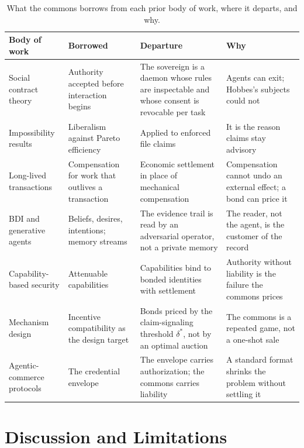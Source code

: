 \documentclass[11pt,a4paper]{article}
\theoremstyle{definition}
\theoremstyle{remark}
\begin{document}
\begin{table}[H]
\centering\small
\caption{What the commons borrows from each prior body of work, where it departs, and why.}
\label{tab:related-borrow-depart}
\begin{tabularx}{\textwidth}{@{}>{\raggedright\arraybackslash}p{} >{\raggedright\arraybackslash}X >{\raggedright\arraybackslash}X >{\raggedright\arraybackslash}X@{}}
\toprule
\textbf{Body of work} & \textbf{Borrowed} & \textbf{Departure} & \textbf{Why} \\
\midrule
Social contract theory & Authority accepted before interaction begins & The sovereign is a daemon whose rules are inspectable and whose consent is revocable per task & Agents can exit; Hobbes's subjects could not \\
Impossibility results & Liberalism against Pareto efficiency & Applied to enforced file claims & It is the reason claims stay advisory \\
Long-lived transactions & Compensation for work that outlives a transaction & Economic settlement in place of mechanical compensation & Compensation cannot undo an external effect; a bond can price it \\
BDI and generative agents & Beliefs, desires, intentions; memory streams & The evidence trail is read by an adversarial operator, not a private memory & The reader, not the agent, is the customer of the record \\
Capability-based security & Attenuable capabilities & Capabilities bind to bonded identities with settlement & Authority without liability is the failure the commons prices \\
Mechanism design & Incentive compatibility as the design target & Bonds priced by the claim-signaling threshold $\delta^{*}$, not by an optimal auction & The commons is a repeated game, not a one-shot sale \\
Agentic-commerce protocols & The credential envelope & The envelope carries authorization; the commons carries liability & A standard format shrinks the problem without settling it \\
\bottomrule
\end{tabularx}
\end{table}

\section{Discussion and Limitations}\label{sec:discussion-limitations}
\end{document}
